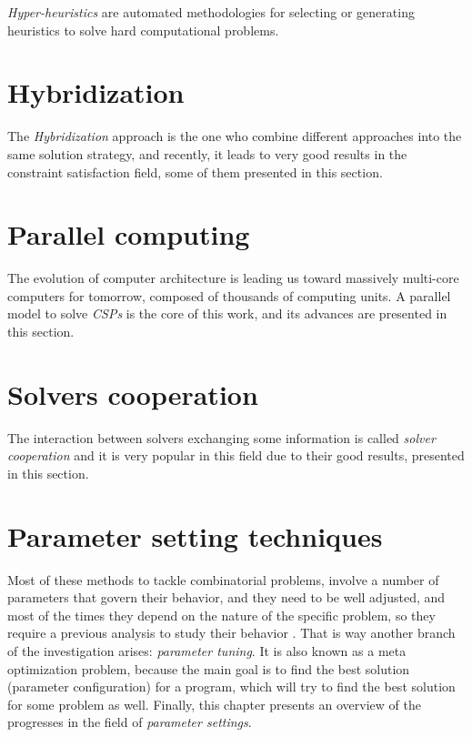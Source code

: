 \documentclass[a4paper]{book} %
\newcommand{\csp}{\textit{CSP}}
\newcommand{\csps}{\csp\textit{s}}
\begin{document}
\textit{Hyper-heuristics} are automated methodologies for selecting or generating heuristics to solve hard computational problems.

\section{Hybridization}

The \textit{Hybridization} approach is the one who combine different approaches into the same solution strategy, and recently, it leads to very good results in the constraint satisfaction field, some of them presented in this section.

\section{Parallel computing}

The evolution of computer architecture is leading us toward massively multi-core computers for tomorrow, composed of thousands of computing units. A parallel model to solve \csps{} is the core of this work, and its advances are presented in this section.

\section{Solvers cooperation}

The interaction between solvers exchanging some information is called {\it solver cooperation} and it is very popular in this field due to their good results, presented in this section.

\section{Parameter setting techniques}

Most of these methods to tackle combinatorial problems, involve a number of parameters that govern their behavior, and they need to be well adjusted, and most of the times they depend on the nature of the specific problem, so they require a previous analysis to study their behavior \cite{Birattari2005}. That is way another branch of the investigation arises: {\it parameter tuning}. It is also known as a meta optimization problem, because the main goal is to find the best solution (parameter configuration) for a program, which will try to find the best solution for some problem as well. Finally, this chapter presents an overview of the progresses in the field of \textit{parameter settings}.
\end{document}
